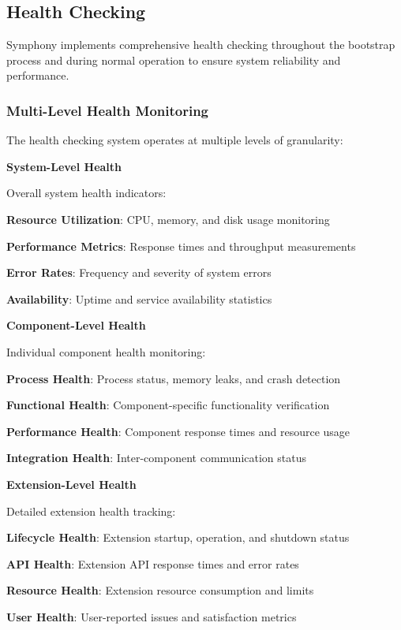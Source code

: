 \subsection{Health Checking}
\label{subsec:health-checking}

Symphony implements comprehensive health checking throughout the bootstrap process and during normal operation to ensure system reliability and performance.

\subsubsection{Multi-Level Health Monitoring}

The health checking system operates at multiple levels of granularity:

\textbf{System-Level Health}

Overall system health indicators:

\begin{compactlist}
    \item \textbf{Resource Utilization}: CPU, memory, and disk usage monitoring
    \item \textbf{Performance Metrics}: Response times and throughput measurements
    \item \textbf{Error Rates}: Frequency and severity of system errors
    \item \textbf{Availability}: Uptime and service availability statistics
\end{compactlist}

\textbf{Component-Level Health}

Individual component health monitoring:

\begin{compactlist}
    \item \textbf{Process Health}: Process status, memory leaks, and crash detection
    \item \textbf{Functional Health}: Component-specific functionality verification
    \item \textbf{Performance Health}: Component response times and resource usage
    \item \textbf{Integration Health}: Inter-component communication status
\end{compactlist}

\textbf{Extension-Level Health}

Detailed extension health tracking:

\begin{compactlist}
    \item \textbf{Lifecycle Health}: Extension startup, operation, and shutdown status
    \item \textbf{API Health}: Extension API response times and error rates
    \item \textbf{Resource Health}: Extension resource consumption and limits
    \item \textbf{User Health}: User-reported issues and satisfaction metrics
\end{compactlist}

